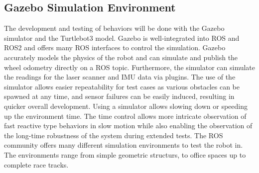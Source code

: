 \subsection{Gazebo Simulation Environment}
The development and testing of behaviors will be done with the Gazebo simulator and the Turtlebot3 model. Gazebo is well-integrated into ROS and ROS2 and offers many ROS interfaces to control the simulation. Gazebo accurately models the physics of the robot and can simulate and publish the wheel odometry directly on a ROS topic. Furthermore, the simulator can simulate the readings for the laser scanner and IMU data via plugins. The use of the simulator allows easier repeatability for test cases as various obstacles can be spawned at any time, and sensor failures can be easily induced, resulting in quicker overall development.
Using a simulator allows slowing down or speeding up the environment time. The time control allows more intricate observation of fast reactive type behaviors in slow motion while also enabling the observation of the long-time robustness of the system during extended tests. 
The ROS community offers many different simulation environments to test the robot in. The environments range from simple geometric structurs, to office spaces up to complete race tracks. 


